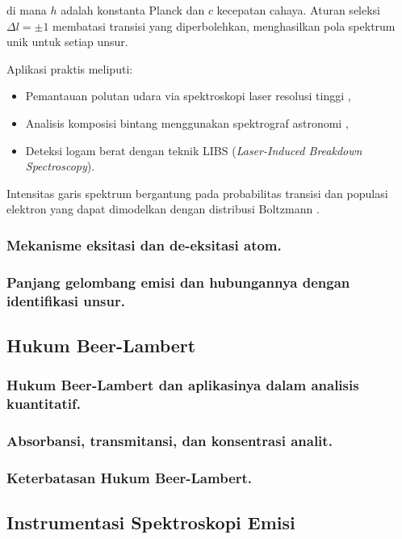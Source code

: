 di mana $h$ adalah konstanta Planck dan $c$ kecepatan cahaya. Aturan seleksi $\Delta l = \pm 1$ \citep{Liboff2003} membatasi transisi yang diperbolehkan, menghasilkan pola spektrum unik untuk setiap unsur.

Aplikasi praktis meliputi:
\begin{itemize}
\item Pemantauan polutan udara via spektroskopi laser resolusi tinggi \citep{Demtroder2010},
\item Analisis komposisi bintang menggunakan spektrograf astronomi \citep{Kaufmann2020},
\item Deteksi logam berat dengan teknik LIBS (\textit{Laser-Induced Breakdown Spectroscopy}).
\end{itemize}

Intensitas garis spektrum bergantung pada probabilitas transisi dan populasi elektron yang dapat dimodelkan dengan distribusi Boltzmann \citep{Demtroder2010}.
\subsubsection{Mekanisme eksitasi dan de-eksitasi atom.}
\subsubsection{Panjang gelombang emisi dan hubungannya dengan identifikasi unsur.}


\subsection{Hukum Beer-Lambert}

\subsubsection{Hukum Beer-Lambert dan aplikasinya dalam analisis kuantitatif.}
\subsubsection{Absorbansi, transmitansi, dan konsentrasi analit.}
\subsubsection{Keterbatasan Hukum Beer-Lambert.}


\subsection{Instrumentasi Spektroskopi Emisi}


